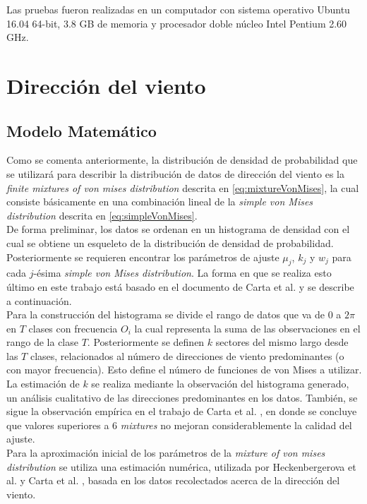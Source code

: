 Las pruebas fueron realizadas en un computador con sistema operativo Ubuntu 16.04 64-bit, 3.8 GB de memoria y procesador doble núcleo Intel Pentium 2.60 GHz. 

\section{Dirección del viento}
\subsection{Modelo Matemático}\label{ss:model_math_dir} 
Como se comenta anteriormente, la distribución de densidad de probabilidad que se utilizará para describir la distribución de datos de dirección del viento
es la \emph{finite mixtures of von mises distribution} descrita en \ref{eq:mixtureVonMises}, la cual consiste básicamente en una combinación lineal de la \emph{simple von Mises distribution} descrita en \ref{eq:simpleVonMises}.\\ 
De forma preliminar, los datos se ordenan en un histograma de densidad con el cual se obtiene un esqueleto de la distribución de densidad de probabilidad. Posteriormente se requieren encontrar los parámetros de ajuste $\mu_j$, $k_j$ y $w_j$ para cada $j$-ésima \emph{simple von Mises distribution}. La forma en que
se realiza esto último en este trabajo está basado en el documento de Carta et al. \cite{Carta07} y se describe a continuación.\\
Para la construcción del histograma se divide el rango de datos que va de 0 a $2\pi$ en $T$ clases con frecuencia $O_i$ la cual representa la suma de las observaciones en el rango de la clase $T$. Posteriormente se definen $k$ sectores del mismo largo desde las $T$ clases, relacionados al número de direcciones de viento predominantes (o con mayor frecuencia). Esto define el número de funciones de von Mises a utilizar. La estimación de $k$ se realiza mediante la observación del histograma generado, un análisis cualitativo de las direcciones predominantes en los datos. También, se sigue la observación empírica en el trabajo de Carta et al. \cite{Carta07}, en donde se concluye que valores superiores a 6 \emph{mixtures} no mejoran considerablemente la calidad del ajuste.\\
Para la aproximación inicial de los parámetros de la \emph{mixture of von mises distribution} se utiliza una estimación numérica, utilizada por Heckenbergerova et al. \cite{Heckenbergerova15} \cite{Heckenbergerova13} y Carta et al. \cite{Carta07}, basada en los datos recolectados acerca de la dirección del viento.\\

